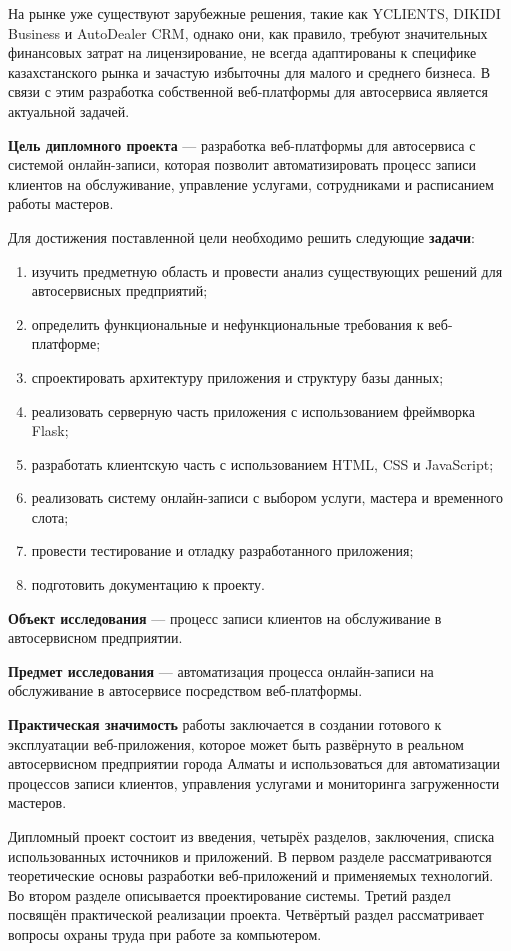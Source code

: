 \documentclass[14pt,a4paper,oneside]{extarticle}
\begin{document}
На рынке уже существуют зарубежные решения, такие как YCLIENTS, DIKIDI Business и AutoDealer CRM, однако они, как правило, требуют значительных финансовых затрат на лицензирование, не всегда адаптированы к специфике казахстанского рынка и зачастую избыточны для малого и среднего бизнеса. В связи с этим разработка собственной веб-платформы для автосервиса является актуальной задачей.

\textbf{Цель дипломного проекта} --- разработка веб-платформы для автосервиса с системой онлайн-записи, которая позволит автоматизировать процесс записи клиентов на обслуживание, управление услугами, сотрудниками и расписанием работы мастеров.

Для достижения поставленной цели необходимо решить следующие \textbf{задачи}:
\begin{enumerate}[leftmargin=2cm]
    \item изучить предметную область и провести анализ существующих решений для автосервисных предприятий;
    \item определить функциональные и нефункциональные требования к веб-платформе;
    \item спроектировать архитектуру приложения и структуру базы данных;
    \item реализовать серверную часть приложения с использованием фреймворка Flask;
    \item разработать клиентскую часть с использованием HTML, CSS и JavaScript;
    \item реализовать систему онлайн-записи с выбором услуги, мастера и временного слота;
    \item провести тестирование и отладку разработанного приложения;
    \item подготовить документацию к проекту.
\end{enumerate}

\textbf{Объект исследования} --- процесс записи клиентов на обслуживание в автосервисном предприятии.

\textbf{Предмет исследования} --- автоматизация процесса онлайн-записи на обслуживание в автосервисе посредством веб-платформы.

\textbf{Практическая значимость} работы заключается в создании готового к эксплуатации веб-приложения, которое может быть развёрнуто в реальном автосервисном предприятии города Алматы и использоваться для автоматизации процессов записи клиентов, управления услугами и мониторинга загруженности мастеров.

Дипломный проект состоит из введения, четырёх разделов, заключения, списка использованных источников и приложений. В первом разделе рассматриваются теоретические основы разработки веб-приложений и применяемых технологий. Во втором разделе описывается проектирование системы. Третий раздел посвящён практической реализации проекта. Четвёртый раздел рассматривает вопросы охраны труда при работе за компьютером.
\end{document}
